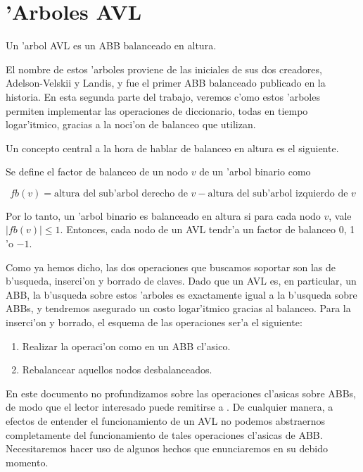 \section{'Arboles AVL}

\begin{defi}
	Un 'arbol AVL es un ABB balanceado en altura.
\end{defi}

El nombre de estos 'arboles proviene de las iniciales de sus dos creadores, Adelson-Velskii y Landis, y fue el primer ABB balanceado publicado en la historia. En esta segunda parte del trabajo, veremos c'omo estos 'arboles permiten implementar las operaciones de diccionario, todas en tiempo logar'itmico, gracias a la noci'on de balanceo que utilizan.

Un concepto central a la hora de hablar de balanceo en altura es el siguiente.

\begin{defi}
	Se define el factor de balanceo de un nodo $v$ de un 'arbol binario como
	
	\[fb(v) = \text{altura del sub'arbol derecho de }v - \text{altura del sub'arbol izquierdo de }v\]
\end{defi}

Por lo tanto, un 'arbol binario es balanceado en altura si para cada nodo $v$, vale $|fb(v)| \leq 1$. Entonces, cada nodo de un AVL tendr'a un factor de balanceo 0, 1 'o $-1$.

Como ya hemos dicho, las dos operaciones que buscamos soportar son las de b'usqueda, inserci'on y borrado de claves. Dado que un AVL es, en particular, un ABB, la b'usqueda sobre estos 'arboles es exactamente igual a la b'usqueda sobre ABBs, y tendremos asegurado un costo logar'itmico gracias al balanceo. Para la inserci'on y borrado, el esquema de las operaciones ser'a el siguiente:

\begin{enumerate}
	\item Realizar la operaci'on como en un ABB cl'asico.
	\item Rebalancear aquellos nodos desbalanceados.
\end{enumerate}

En este documento no profundizamos sobre las operaciones cl'asicas sobre ABBs, de modo que el lector interesado puede remitirse a \cite{cormen01}. De cualquier manera, a efectos de entender el funcionamiento de un AVL no podemos abstraernos completamente del funcionamiento de tales operaciones cl'asicas de ABB. Necesitaremos hacer uso de algunos hechos que enunciaremos en su debido momento.

